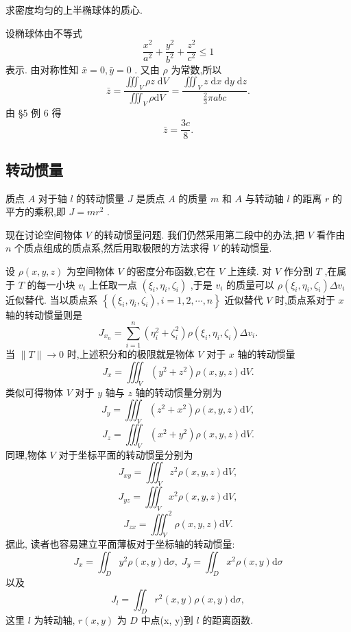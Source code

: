 \begin{example}

\end{example}
求密度均匀的上半椭球体的质心.

\begin{solution}

\end{solution}
设椭球体由不等式
\[
\frac{{x}^{2}}{{a}^{2}} + \frac{{y}^{2}}{{b}^{2}} + \frac{{z}^{2}}{{c}^{2}} \leq  1
\]
表示. 由对称性知 \(\bar{x} = 0,\bar{y} = 0\) . 又由 \(\rho\) 为常数,所以
\[
\bar{z} = \frac{{\iiint }_{V}{\rho z}\mathrm{\;d}V}{{\iiint }_{V}\rho \mathrm{d}V} = \frac{{\iiint }_{V}z\mathrm{\;d}x\mathrm{\;d}y\mathrm{\;d}z}{\frac{2}{3}{\pi abc}}.
\]
由 §5 例 6 得
\[
\bar{z} = \frac{3c}{8}.
\]
\subsection{转动惯量}

质点 \(A\) 对于轴 \(l\) 的转动惯量 \(J\) 是质点 \(A\) 的质量 \(m\) 和 \(A\) 与转动轴 \(l\) 的距离 \(r\) 的平方的乘积,即 \(J = m{r}^{2}\) .

现在讨论空间物体 \(V\) 的转动惯量问题. 我们仍然采用第二段中的办法,把 \(V\) 看作由 \(n\) 个质点组成的质点系,然后用取极限的方法求得 \(V\) 的转动惯量.

设 \(\rho \left( {x,y,z}\right)\) 为空间物体 \(V\) 的密度分布函数,它在 \(V\) 上连续. 对 \(V\) 作分割 \(T\) ,在属于 \(T\) 的每一小块 \({v}_{i}\) 上任取一点 \(\left( {{\xi }_{i},{\eta }_{i},{\zeta }_{i}}\right)\) ,于是 \({v}_{i}\) 的质量可以 \(\rho \left( {{\xi }_{i},{\eta }_{i},{\zeta }_{i}}\right) \Delta {v}_{i}\) 近似替代. 当以质点系 \(\left\{  {\left( {{\xi }_{i},{\eta }_{i},{\zeta }_{i}}\right) ,i = 1,2,\cdots ,n}\right\}\) 近似替代 \(V\) 时,质点系对于 \(x\) 轴的转动惯量则是
\[
{J}_{{x}_{n}} = \mathop{\sum }\limits_{{i = 1}}^{n}\left( {{\eta }_{i}^{2} + {\zeta }_{i}^{2}}\right) \rho \left( {{\xi }_{i},{\eta }_{i},{\zeta }_{i}}\right) \Delta {v}_{i}.
\]
当 \(\parallel T\parallel  \rightarrow  0\) 时,上述积分和的极限就是物体 \(V\) 对于 \(x\) 轴的转动惯量
\[
{J}_{x} = {\iiint }_{V}\left( {{y}^{2} + {z}^{2}}\right) \rho \left( {x,y,z}\right) \mathrm{d}V.
\]
类似可得物体 \(V\) 对于 \(y\) 轴与 \(z\) 轴的转动惯量分别为
\[
{J}_{y} = {\iiint }_{V}\left( {{z}^{2} + {x}^{2}}\right) \rho \left( {x,y,z}\right) \mathrm{d}V,
\]
\[
{J}_{z} = {\iiint }_{V}\left( {{x}^{2} + {y}^{2}}\right) \rho \left( {x,y,z}\right) \mathrm{d}V.
\]
同理,物体 \(V\) 对于坐标平面的转动惯量分别为
\[
{J}_{xy} = {\iiint }_{V}{z}^{2}\rho \left( {x,y,z}\right) \mathrm{d}V,
\]
\[
{J}_{yz} = {\iiint }_{V}{x}^{2}\rho \left( {x,y,z}\right) \mathrm{d}V,
\]
\[
{J}_{zx} = {\iiint }_{V}^{2}\rho \left( {x,y,z}\right) \mathrm{d}V.
\]
据此, 读者也容易建立平面薄板对于坐标轴的转动惯量:
\[
{J}_{x} = {\iint }_{D}{y}^{2}\rho \left( {x,y}\right) \mathrm{d}\sigma ,\;{J}_{y} = {\iint }_{D}{x}^{2}\rho \left( {x,y}\right) \mathrm{d}\sigma
\]
以及
\[
{J}_{l} = {\iint }_{D}{r}^{2}\left( {x,y}\right) \rho \left( {x,y}\right) \mathrm{d}\sigma ,
\]
这里 \(l\) 为转动轴, \(r\left( {x,y}\right)\) 为 \(D\) 中点(x, y)到 \(l\) 的距离函数.

